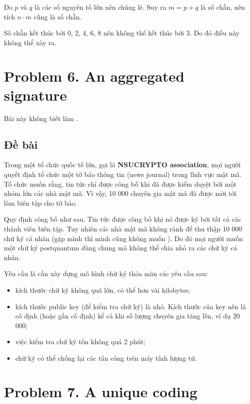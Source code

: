 Do $p$ và $q$ là các số nguyên tố lớn nên chúng lẻ. Suy ra $m = p + q$ là số chẵn, nên tích $n \cdot m$ cũng là số chẵn.

Số chẵn kết thúc bởi 0, 2, 4, 6, 8 nên không thể kết thúc bởi 3. Do đó điều này không thể xảy ra.

\section*{Problem 6. An aggregated signature}

Bài này không biết làm .

\subsection*{Đề bài}

Trong một tổ chức quốc tế lớn, gọi là \textbf{NSUCRYPTO association}, mọi người quyết định tổ chức một tờ báo thông tin (news journal) trong lĩnh vực mật mã. Tổ chức muốn rằng, tin tức chỉ được công bố khi đã được kiểm duyệt bởi một nhóm lớn các nhà mật mã. Vì vậy, 10 000 chuyên gia mật mã đã được mời tới làm biên tập cho tờ báo.

Quy định công bố như sau. Tin tức được công bố khi nó được ký bởi tất cả các thành viên biên tập. Tuy nhiên các nhà mật mã không rảnh để thu thập 10 000 chữ ký cá nhân (gặp mình thì mình cũng không muốn ). Do đó mọi người muốn một chữ ký postquantum dùng chung mà không thể chia nhỏ ra các chữ ký cá nhân.

Yêu cầu là cần xây dựng mô hình chữ ký thỏa mãn các yêu cầu sau:

\begin{itemize}
    \item kích thước chữ ký không quá lớn, có thể hơn vài kilobytes;
    \item kích thước public key (để kiểm tra chữ ký) là nhỏ. Kích thước của key nên là cố định (hoặc gần cố định) kể cả khi số lượng chuyên gia tăng lên, ví dụ 20 000;
    \item việc kiểm tra chữ ký tốn không quá 2 phút;
    \item chữ ký có thể chống lại các tấn công trên máy tính lượng tử.
\end{itemize}

\section*{Problem 7. A unique coding}

